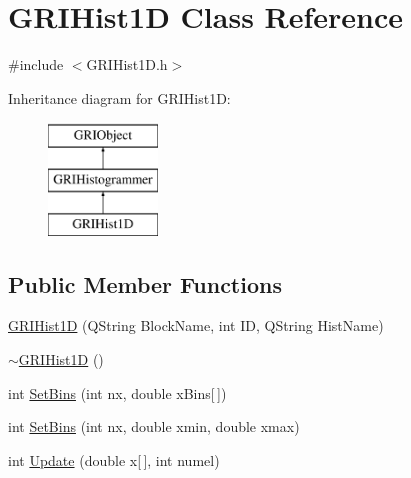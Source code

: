 \hypertarget{classGRIHist1D}{\section{\-G\-R\-I\-Hist1\-D \-Class \-Reference}
\label{classGRIHist1D}
}


{\ttfamily \#include $<$\-G\-R\-I\-Hist1\-D.\-h$>$}

\-Inheritance diagram for \-G\-R\-I\-Hist1\-D\-:\begin{figure}[H]
\begin{center}
\leavevmode
\includegraphics[height=3.000000cm]{classGRIHist1D}
\end{center}
\end{figure}
\subsection*{\-Public \-Member \-Functions}
\begin{DoxyCompactItemize}
\item 
\hyperlink{classGRIHist1D_aca2ee4e71e662a061c9dff8205054f8c}{\-G\-R\-I\-Hist1\-D} (\-Q\-String \-Block\-Name, int \-I\-D, \-Q\-String \-Hist\-Name)
\item 
\hyperlink{classGRIHist1D_abb6c88343aaa7783987cfa90feaa5172}{$\sim$\-G\-R\-I\-Hist1\-D} ()
\item 
int \hyperlink{classGRIHist1D_a3a6f3758500356fd49248983cfd959c5}{\-Set\-Bins} (int nx, double x\-Bins\mbox{[}$\,$\mbox{]})
\item 
int \hyperlink{classGRIHist1D_a1ec7a67a3e670e416b10a770156cc579}{\-Set\-Bins} (int nx, double xmin, double xmax)
\item 
int \hyperlink{classGRIHist1D_a77737f09b753f72afc93e92159c1e5b0}{\-Update} (double x\mbox{[}$\,$\mbox{]}, int numel)
\end{DoxyCompactItemize}


